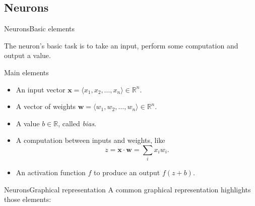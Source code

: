 \documentclass{beamer}
\begin{document}
    \subsection{Neurons}
    \begin{frame}{Neurons}{Basic elements}

        The neuron's basic task is to take an input, perform some computation and
        output a value.

        \begin{block}{Main elements}
            \begin{itemize}
                \item An input vector $\mathbf{x} = \langle x_1, x_2, \ldots, x_n \rangle \in \mathbb{R}^n$.
                \item A vector of weights $\mathbf{w} = \langle w_1, w_2, \ldots, w_n \rangle \in \mathbb{R}^n$.
                \item A value $b \in \mathbb{R}$, called \emph{bias}.
                \item A computation between inputs and weights, like 
                    $$z=\mathbf{x}\cdot\mathbf{w} =\sum_i x_iw_i.$$
                \item An activation function $f$ to produce an output $f(z + b)$.
            \end{itemize}
        \end{block}
    \end{frame}

    \begin{frame}{Neurons}{Graphical representation}
        A common graphical representation highlights those elements:
        \begin{figure}
            \centering
        \end{figure}
    \end{frame}
\end{document}
